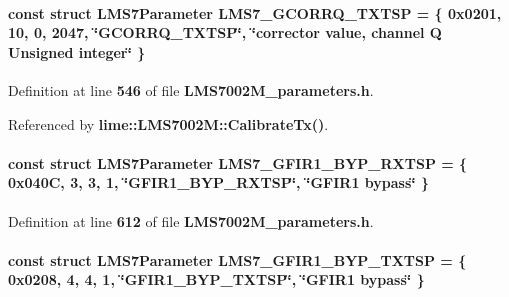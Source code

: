\paragraph[{L\+M\+S7\+\_\+\+G\+C\+O\+R\+R\+Q\+\_\+\+T\+X\+T\+SP}]{\setlength{\rightskip}{0pt plus 5cm}const struct {\bf L\+M\+S7\+Parameter} L\+M\+S7\+\_\+\+G\+C\+O\+R\+R\+Q\+\_\+\+T\+X\+T\+SP = \{ 0x0201, 10, 0, 2047, \char`\"{}\+G\+C\+O\+R\+R\+Q\+\_\+\+T\+X\+T\+S\+P\char`\"{}, \char`\"{}corrector value, channel Q Unsigned integer\char`\"{} \}\hspace{0.3cm}{\ttfamily [static]}}\label{LMS7002M__parameters_8h_a0401435b58f217681c66c5abfa6a4d36}


Definition at line {\bf 546} of file {\bf L\+M\+S7002\+M\+\_\+parameters.\+h}.



Referenced by {\bf lime\+::\+L\+M\+S7002\+M\+::\+Calibrate\+Tx()}.

\paragraph[{L\+M\+S7\+\_\+\+G\+F\+I\+R1\+\_\+\+B\+Y\+P\+\_\+\+R\+X\+T\+SP}]{\setlength{\rightskip}{0pt plus 5cm}const struct {\bf L\+M\+S7\+Parameter} L\+M\+S7\+\_\+\+G\+F\+I\+R1\+\_\+\+B\+Y\+P\+\_\+\+R\+X\+T\+SP = \{ 0x040\+C, 3, 3, 1, \char`\"{}\+G\+F\+I\+R1\+\_\+\+B\+Y\+P\+\_\+\+R\+X\+T\+S\+P\char`\"{}, \char`\"{}\+G\+F\+I\+R1 bypass\char`\"{} \}\hspace{0.3cm}{\ttfamily [static]}}\label{LMS7002M__parameters_8h_ae1c9ae71feaad9f18d83c1a3e0562dd8}


Definition at line {\bf 612} of file {\bf L\+M\+S7002\+M\+\_\+parameters.\+h}.

\paragraph[{L\+M\+S7\+\_\+\+G\+F\+I\+R1\+\_\+\+B\+Y\+P\+\_\+\+T\+X\+T\+SP}]{\setlength{\rightskip}{0pt plus 5cm}const struct {\bf L\+M\+S7\+Parameter} L\+M\+S7\+\_\+\+G\+F\+I\+R1\+\_\+\+B\+Y\+P\+\_\+\+T\+X\+T\+SP = \{ 0x0208, 4, 4, 1, \char`\"{}\+G\+F\+I\+R1\+\_\+\+B\+Y\+P\+\_\+\+T\+X\+T\+S\+P\char`\"{}, \char`\"{}\+G\+F\+I\+R1 bypass\char`\"{} \}\hspace{0.3cm}{\ttfamily [static]}}\label{LMS7002M__parameters_8h_a1bd99433c32dfa59eaf33d00e8d817a0}



